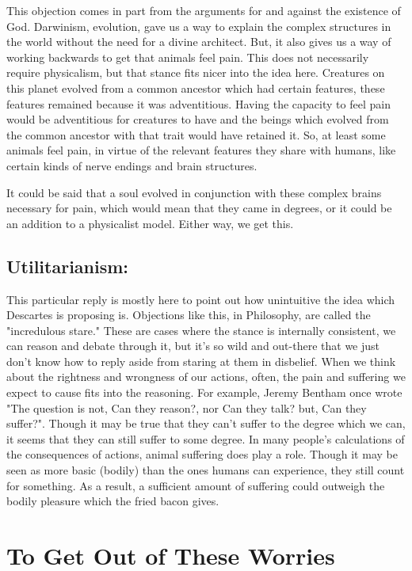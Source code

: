 This objection comes in part from the arguments for and against the existence of God. Darwinism, evolution, gave us a way to explain the complex structures in the world without the need for a divine architect. But, it also gives us a way of working backwards to get that animals feel pain.  This does not necessarily require physicalism, but that stance fits nicer into the idea here.  Creatures on this planet evolved from a common ancestor which had certain features, these features remained because it was adventitious. Having the capacity to feel pain would be adventitious for creatures to have and the beings which evolved from the common ancestor with that trait would have retained it. So, at least some animals feel pain, in virtue of the relevant features they share with humans, like certain kinds of nerve endings and brain structures.

It could be said that a soul evolved in conjunction with these complex brains necessary for pain, which would mean that they came in degrees, or it could be an addition to a physicalist model. Either way, we get this.
  
\subsection{Utilitarianism:}

This particular reply is mostly here to point out how unintuitive the idea which Descartes is proposing is. Objections like this, in Philosophy, are called the "incredulous stare." These are cases where the stance is internally consistent, we can reason and debate through it, but it's so wild and out-there that we just don't know how to reply aside from staring at them in disbelief.  When we think about the rightness and wrongness of our actions, often, the pain and suffering we expect to cause fits into the reasoning. For example, Jeremy Bentham once wrote "The question is not, Can they reason?, nor Can they talk? but, Can they suffer?".\autocite{Bentham1}  Though it may be true that they can't suffer to the degree which we can, it seems that they can still suffer to some degree. In many people’s calculations of the consequences of actions, animal suffering does play a role. Though it may be seen as more basic (bodily) than the ones humans can experience, they still count for something. As a result, a sufficient amount of suffering could outweigh the bodily pleasure which the fried bacon gives. 
\section{To Get Out of These Worries}

